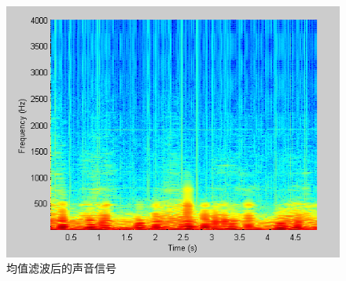 \documentclass[16pt,a4paper]{article}
\begin{document}
\begin{figure}[H]
\centering
\includegraphics[scale = 1]{avg_filtered.png}
\caption{均值滤波后的声音信号} 
\end{figure} 	
\end{document}
